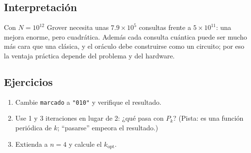 \subsection{Interpretación}
Con $N=10^{12}$ Grover necesita unas $7.9\times10^5$ consultas frente a
$5\times10^{11}$: una mejora enorme, pero cuadrática. Además cada consulta
cuántica puede ser mucho más cara que una clásica, y el oráculo debe
construirse como un circuito; por eso la ventaja práctica depende del
problema y del hardware.

\subsection{Ejercicios}
\begin{enumerate}
  \item Cambie \texttt{marcado} a \texttt{"010"} y verifique el resultado.
  \item Use 1 y 3 iteraciones en lugar de 2: ¿qué pasa con $P_k$? (Pista:
    es una función periódica de $k$; ``pasarse'' empeora el resultado.)
  \item Extienda a $n=4$ y calcule el $k_{\text{opt}}$.
\end{enumerate}


